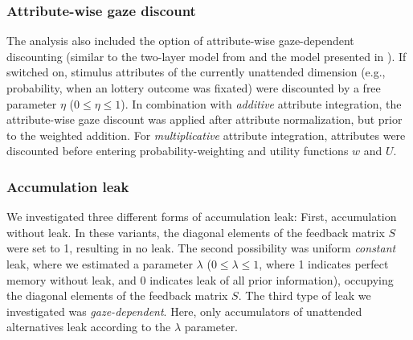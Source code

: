 \documentclass[11pt, a4paper]{article}
\begin{document}
\subsubsection*{Attribute-wise gaze discount}
The analysis also included the option of attribute-wise gaze-dependent discounting (similar to the two-layer model from \textcite{glickman2019FormationPreferenceRisky} and the model presented in \textcite{fisher2017AttentionalDriftDiffusion}). If switched on, stimulus attributes of the currently unattended dimension (e.g., probability, when an lottery outcome was fixated) were discounted by a free parameter $\eta$ ($0 \le \eta \le 1$). In combination with \emph{additive} attribute integration, the attribute-wise gaze discount was applied after attribute normalization, but prior to the weighted addition. For \emph{multiplicative} attribute integration, attributes were discounted before entering probability-weighting and utility functions $w$ and $U$.

\subsubsection*{Accumulation leak}
We investigated three different forms of accumulation leak: First, accumulation without leak. In these variants, the diagonal elements of the feedback matrix $S$ were set to 1, resulting in no leak. The second possibility was uniform \emph{constant} leak, where we estimated a parameter $\lambda$ ($0 \le \lambda \le 1$, where 1 indicates perfect memory without leak, and 0 indicates leak of all prior information), occupying the diagonal elements of the feedback matrix $S$.
The third type of leak we investigated was \emph{gaze-dependent}. Here, only accumulators of unattended alternatives leak according to the $\lambda$ parameter.
\end{document}
